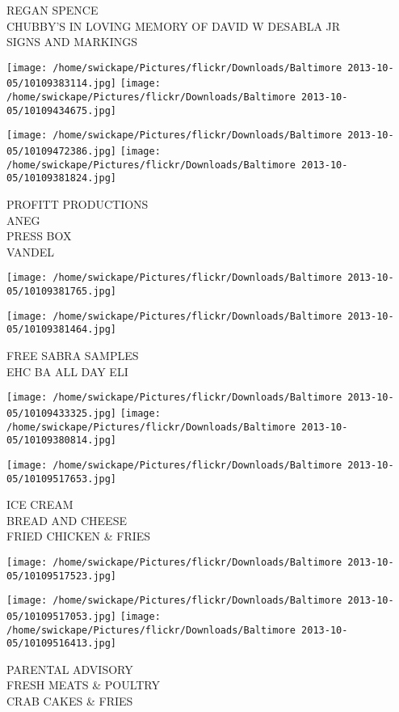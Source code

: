 \documentclass[10pt,letterpaper]{article}
\begin{document}
REGAN SPENCE\\
CHUBBY'S IN LOVING MEMORY OF DAVID W DESABLA JR\\
SIGNS AND MARKINGS
\pagebreak

\texttt{[image: /home/swickape/Pictures/flickr/Downloads/Baltimore 2013-10-05/10109383114.jpg]}
\texttt{[image: /home/swickape/Pictures/flickr/Downloads/Baltimore 2013-10-05/10109434675.jpg]}

\texttt{[image: /home/swickape/Pictures/flickr/Downloads/Baltimore 2013-10-05/10109472386.jpg]}
\texttt{[image: /home/swickape/Pictures/flickr/Downloads/Baltimore 2013-10-05/10109381824.jpg]}

PROFITT PRODUCTIONS\\
ANEG\\
PRESS BOX\\
VANDEL
\pagebreak

\texttt{[image: /home/swickape/Pictures/flickr/Downloads/Baltimore 2013-10-05/10109381765.jpg]}

\vspace{0.25in}
\texttt{[image: /home/swickape/Pictures/flickr/Downloads/Baltimore 2013-10-05/10109381464.jpg]}

FREE SABRA SAMPLES\\
EHC BA ALL DAY ELI
\pagebreak

\texttt{[image: /home/swickape/Pictures/flickr/Downloads/Baltimore 2013-10-05/10109433325.jpg]}
\texttt{[image: /home/swickape/Pictures/flickr/Downloads/Baltimore 2013-10-05/10109380814.jpg]}

\texttt{[image: /home/swickape/Pictures/flickr/Downloads/Baltimore 2013-10-05/10109517653.jpg]}

ICE CREAM\\
BREAD AND CHEESE\\
FRIED CHICKEN \& FRIES
\pagebreak

\texttt{[image: /home/swickape/Pictures/flickr/Downloads/Baltimore 2013-10-05/10109517523.jpg]}

\vspace{0.25in}
\texttt{[image: /home/swickape/Pictures/flickr/Downloads/Baltimore 2013-10-05/10109517053.jpg]}
\texttt{[image: /home/swickape/Pictures/flickr/Downloads/Baltimore 2013-10-05/10109516413.jpg]}

PARENTAL ADVISORY\\
FRESH MEATS \& POULTRY\\
CRAB CAKES \& FRIES
\pagebreak
\end{document}
